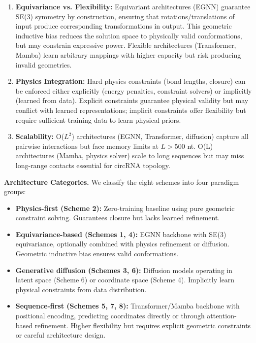 \documentclass[12pt]{article}
\begin{document}
\begin{enumerate}
\item \textbf{Equivariance vs. Flexibility:} Equivariant architectures (EGNN) guarantee SE(3) symmetry by construction, ensuring that rotations/translations of input produce corresponding transformations in output. This geometric inductive bias reduces the solution space to physically valid conformations, but may constrain expressive power. Flexible architectures (Transformer, Mamba) learn arbitrary mappings with higher capacity but risk producing invalid geometries.

\item \textbf{Physics Integration:} Hard physics constraints (bond lengths, closure) can be enforced either explicitly (energy penalties, constraint solvers) or implicitly (learned from data). Explicit constraints guarantee physical validity but may conflict with learned representations; implicit constraints offer flexibility but require sufficient training data to learn physical priors.

\item \textbf{Scalability:} O($L^2$) architectures (EGNN, Transformer, diffusion) capture all pairwise interactions but face memory limits at $L>500$ nt. O(L) architectures (Mamba, physics solver) scale to long sequences but may miss long-range contacts essential for circRNA topology.
\end{enumerate}

\textbf{Architecture Categories.} We classify the eight schemes into four paradigm groups:

\begin{itemize}
\item \textbf{Physics-first (Scheme 2):} Zero-training baseline using pure geometric constraint solving. Guarantees closure but lacks learned refinement.

\item \textbf{Equivariance-based (Schemes 1, 4):} EGNN backbone with SE(3) equivariance, optionally combined with physics refinement or diffusion. Geometric inductive bias ensures valid conformations.

\item \textbf{Generative diffusion (Schemes 3, 6):} Diffusion models operating in latent space (Scheme 6) or coordinate space (Scheme 4). Implicitly learn physical constraints from data distribution.

\item \textbf{Sequence-first (Schemes 5, 7, 8):} Transformer/Mamba backbone with positional encoding, predicting coordinates directly or through attention-based refinement. Higher flexibility but requires explicit geometric constraints or careful architecture design.
\end{itemize}
\end{document}
